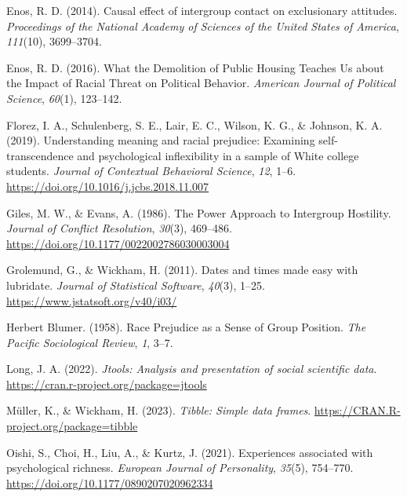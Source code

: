 \documentclass[
  man,floatsintext]{apa7}
\newlength{\cslhangindent}
\newlength{\cslentryspacingunit} %
\newenvironment{CSLReferences}[2] %
 {%
  \setlength{\parindent}{0pt}
  \ifodd #1
  \let\oldpar\par
  \def\par{\hangindent=\cslhangindent\oldpar}
  \fi
  \setlength{\parskip}{#2\cslentryspacingunit}
 }%
 {}
\begin{document}
\begin{CSLReferences}{1}{0}
\leavevmode{}%
Enos, R. D. (2014). Causal effect of intergroup contact on exclusionary attitudes. \emph{Proceedings of the National Academy of Sciences of the United States of America}, \emph{111}(10), 3699--3704.

\leavevmode{}%
Enos, R. D. (2016). What the {Demolition} of {Public Housing Teaches Us} about the {Impact} of {Racial Threat} on {Political Behavior}. \emph{American Journal of Political Science}, \emph{60}(1), 123--142.

\leavevmode{}%
Florez, I. A., Schulenberg, S. E., Lair, E. C., Wilson, K. G., \& Johnson, K. A. (2019). Understanding meaning and racial prejudice: {Examining} self-transcendence and psychological inflexibility in a sample of {White} college students. \emph{Journal of Contextual Behavioral Science}, \emph{12}, 1--6. \url{https://doi.org/10.1016/j.jcbs.2018.11.007}

\leavevmode{}%
Giles, M. W., \& Evans, A. (1986). The {Power Approach} to {Intergroup Hostility}. \emph{Journal of Conflict Resolution}, \emph{30}(3), 469--486. \url{https://doi.org/10.1177/0022002786030003004}

\leavevmode{}%
Grolemund, G., \& Wickham, H. (2011). Dates and times made easy with {lubridate}. \emph{Journal of Statistical Software}, \emph{40}(3), 1--25. \url{https://www.jstatsoft.org/v40/i03/}

\leavevmode{}%
Herbert Blumer. (1958). Race {Prejudice} as a {Sense} of {Group Position}. \emph{The Pacific Sociological Review}, \emph{1}, 3--7.

\leavevmode{}%
Long, J. A. (2022). \emph{Jtools: Analysis and presentation of social scientific data}. \url{https://cran.r-project.org/package=jtools}

\leavevmode{}%
Müller, K., \& Wickham, H. (2023). \emph{Tibble: Simple data frames}. \url{https://CRAN.R-project.org/package=tibble}

\leavevmode{}%
Oishi, S., Choi, H., Liu, A., \& Kurtz, J. (2021). Experiences associated with psychological richness. \emph{European Journal of Personality}, \emph{35}(5), 754--770. \url{https://doi.org/10.1177/0890207020962334}


\end{CSLReferences}
\end{document}
